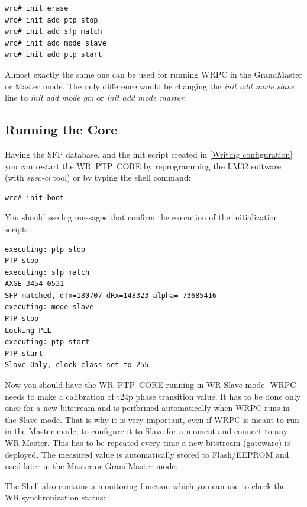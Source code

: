 \documentclass[a4paper, 12pt]{article}
\newcommand{\codeHook}[1]{\mbox{\ttfamily\MakeTextUppercase{#1}}}
\begin{document}
\begin{lstlisting}
wrc# init erase
wrc# init add ptp stop
wrc# init add sfp match
wrc# init add mode slave
wrc# init add ptp start
\end{lstlisting}

Almost exactly the same one can be used for running \codeHook{wrpc} in the GrandMaster
or Master mode. The only difference would be changing the
\textit{init add mode slave} line to \textit{init add mode gm} or
\textit{init add mode master}.

\subsection{Running the Core}
\label{Running the Core}

Having the \codeHook{sfp} database, and the init script created in \ref{Writing
configuration} you can restart the \codeHook{wr ptp core} by reprogramming the
\codeHook{lm32} software (with \textit{spec-cl} tool) or by typing the shell command:

\begin{lstlisting}
wrc# init boot
\end{lstlisting}

You should see log messages that confirm the execution of the initialization
script:

\begin{lstlisting}
executing: ptp stop
PTP stop
executing: sfp match
AXGE-3454-0531
SFP matched, dTx=180707 dRx=148323 alpha=-73685416
executing: mode slave
PTP stop
Locking PLL
executing: ptp start
PTP start
Slave Only, clock class set to 255
\end{lstlisting}

Now you should have the \codeHook{wr ptp core} running in \codeHook{wr} Slave mode.
\codeHook{wrpc} needs to make a calibration of t24p phase transition value. It has to
be done only once for a new bitstream and is performed automatically when
\codeHook{wrpc} runs in the Slave mode. That is why it is very important, even if
\codeHook{wrpc} is meant to run in the Master mode, to configure it to Slave for a
moment and connect to any \codeHook{wr} Master. This has to be repeated every time
a new bitstream (gateware) is deployed. The measured value is automatically
stored to Flash/EEPROM and used later in the Master or GrandMaster mode.

The Shell also contains a monitoring function which you can use to check the
\codeHook{wr} synchronization status:
\end{document}
